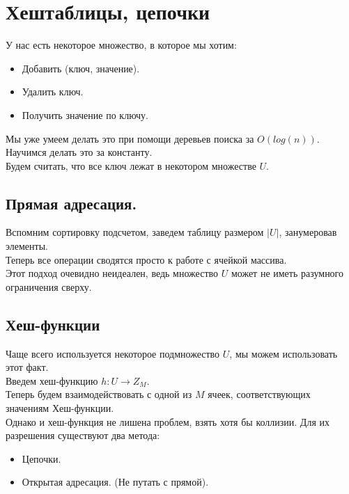 \section{Хештаблицы, цепочки}%
\label{sec:Хештаблицы, цепочки}

У нас есть некоторое множество, в которое мы хотим:
\begin{itemize}
    \item Добавить (ключ, значение).
    \item Удалить ключ.
    \item Получить значение по ключу.
\end{itemize}

Мы уже умеем делать это при помощи деревьев поиска за $O(log(n))$. Научимся делать это за константу. \\
Будем считать, что все ключ лежат в некотором множестве $U$.

\subsection{Прямая адресация.}%
\label{sub:Прямая адресация.}

Вспомним сортировку подсчетом, заведем таблицу размером $\lvert U \rvert$, занумеровав элементы. \\
Теперь все операции сводятся просто к работе с ячейкой массива. \\
Этот подход очевидно неидеален, ведь множество $U$ может не иметь разумного ограничения сверху. \\

\subsection{Хеш-функции}%
\label{sub:{Хеш-функции}}

Чаще всего используется некоторое подмножество $U$, мы можем использовать этот факт. \\
Введем хеш-функцию $h: U \to Z_M$. \\
Теперь будем взаимодействовать с одной из $M$ ячеек, соответствующих значениям Хеш-функции. \\
Однако и хеш-функция не лишена проблем, взять хотя бы коллизии. Для их разрешения существуют два метода: \\
 \begin{itemize}
    \item Цепочки.
    \item Открытая адресация. (Не путать с прямой).
\end{itemize}


